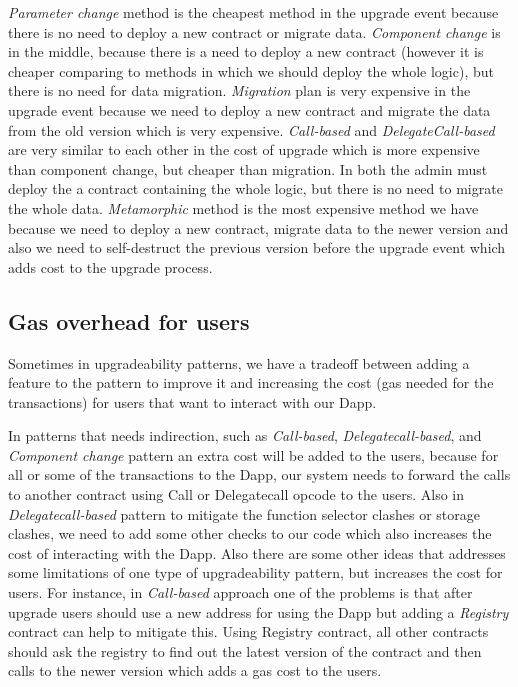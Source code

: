  \textit{Parameter change} method is the cheapest method in the upgrade event because there is no need to deploy a new contract or migrate data.
 \textit{Component change} is in the middle, because there is a need to deploy a new contract (however it is cheaper comparing to methods in which we should deploy the whole logic), but there is no need for data migration.
 \textit{Migration} plan is very expensive in the upgrade event because we need to deploy a new contract and migrate the data from the old version which is very expensive.
 \textit{Call-based} and \textit{DelegateCall-based} are very similar to each other in the cost of upgrade which is more expensive than component change, but cheaper than migration. In both the admin must deploy the a contract containing the whole logic, but there is no need to migrate the whole data.
 \textit{Metamorphic} method is the most expensive method we have because we need to deploy a new contract, migrate data to the newer version and also we need to self-destruct the previous version before the upgrade event which adds cost to the upgrade process.


\subsection{Gas overhead for users}
Sometimes in upgradeability patterns, we have a tradeoff between adding a feature to the pattern to improve it and increasing the cost (gas needed for the transactions) for users that want to interact with our Dapp.

In patterns that needs indirection, such as \textit{Call-based}, \textit{Delegatecall-based}, and \textit{Component change} pattern an extra cost will be added to the users, because for all or some of the transactions to the Dapp, our system needs to forward the calls to another contract using Call or Delegatecall opcode to the users. 
Also in \textit{Delegatecall-based} pattern to mitigate the function selector clashes or storage clashes, we need to add some other checks to our code which also increases the cost of interacting with the Dapp.
Also there are some other ideas that addresses some limitations of one type of upgradeability pattern, but increases the cost for users. For instance, in \textit{Call-based} approach one of the problems is that after upgrade users should use a new address for using the Dapp but adding a \emph{Registry} contract can help to mitigate this. Using Registry contract, all other contracts should ask the registry to find out the latest version of the contract and then calls to the newer version which adds a gas cost to the users. 
 
